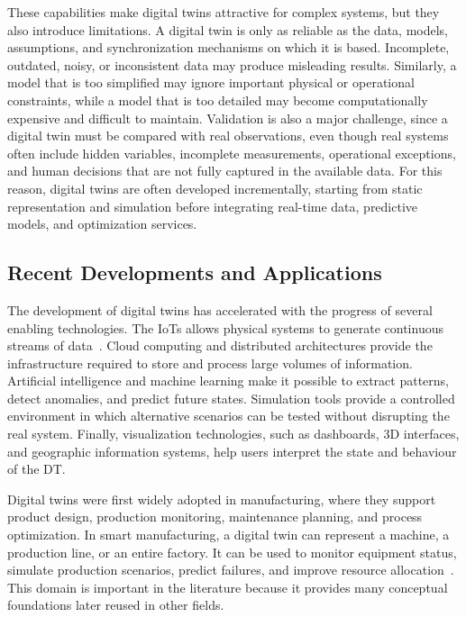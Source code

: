 These capabilities make digital twins attractive for complex systems, but they also introduce limitations. A digital twin 
is only as reliable as the data, models, assumptions, and synchronization mechanisms on which it is based. Incomplete, 
outdated, noisy, or inconsistent data may produce misleading results. Similarly, a model that is too simplified may ignore 
important physical or operational constraints, while a model that is too detailed may become computationally expensive and 
difficult to maintain. Validation is also a major challenge, since a digital twin must be compared with real observations, 
even though real systems often include hidden variables, incomplete measurements, operational exceptions, and human 
decisions that are not fully captured in the available data. For this reason, digital twins are often developed 
incrementally, starting from static representation and simulation before integrating real-time data, predictive models, 
and optimization services.

\subsection{Recent Developments and Applications}
The development of digital twins has accelerated with the progress of several enabling technologies. The IoTs allows 
physical systems to generate continuous streams of data~\cite{DT_survey}. Cloud computing and distributed architectures 
provide the infrastructure required to store and process large volumes of information. Artificial intelligence and machine 
learning make it possible to extract patterns, detect anomalies, and predict future states. Simulation tools provide a 
controlled environment in which alternative scenarios can be tested without disrupting the real system. Finally, 
visualization technologies, such as dashboards, 3D interfaces, and geographic information systems, help users interpret the 
state and behaviour of the DT.\@

Digital twins were first widely adopted in manufacturing, where they support product design, production monitoring, 
maintenance planning, and process optimization. In smart manufacturing, a digital twin can represent a machine, a 
production line, or an entire factory. It can be used to monitor equipment status, simulate production scenarios, predict 
failures, and improve resource allocation~\cite{DT_smart_manufacturing}. This domain is important in the literature 
because it provides many conceptual foundations later reused in other fields.

